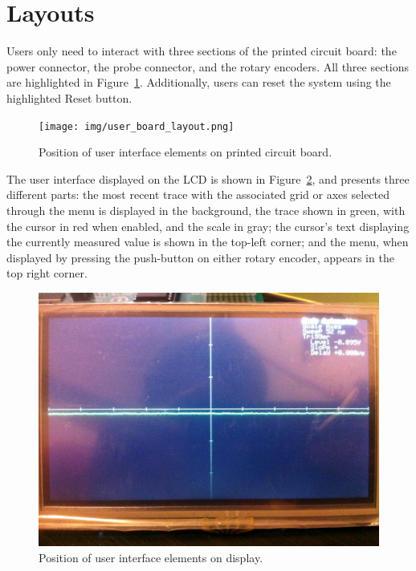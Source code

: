 \documentclass[titlepage]{scrartcl}
\begin{document}
	\section{Layouts}
	Users only need to interact with three sections of the printed circuit board: the power connector, the probe connector, and the rotary encoders. All three sections are highlighted in Figure~\ref{fig:user_board_layout}. Additionally, users can reset the system using the highlighted Reset button. \\

	\begin{figure}[h]
	\texttt{[image: img/user\_board\_layout.png]}
                	\caption{Position of user interface elements on printed circuit board.}
               	\label{fig:user_board_layout}
	\end{figure}

	The user interface displayed on the LCD is shown in Figure~\ref{fig:user_screen_layout}, and presents three different parts: the most recent trace with the associated grid or axes selected through the menu is displayed in the background, the trace shown in green, with the cursor in red when enabled, and the scale in gray; the cursor's text displaying the currently measured value is shown in the top-left corner; and the menu, when displayed by pressing the push-button on either rotary encoder, appears in the top right corner.

	\begin{figure}[t]
	\includegraphics[width=\textwidth]{img/user_screen_layout.jpg}
                	\caption{Position of user interface elements on display.}
               	\label{fig:user_screen_layout}
	\end{figure}
\end{document}

